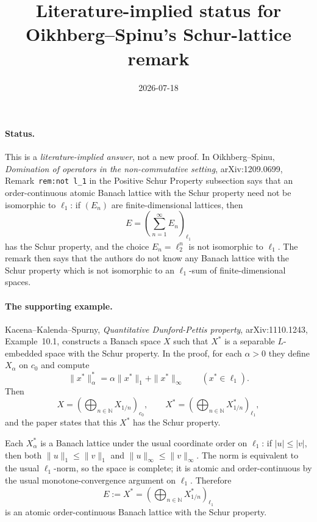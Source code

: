 \documentclass[11pt]{article}
\title{Literature-implied status for Oikhberg--Spinu's Schur-lattice remark}
\author{}
\date{2026-07-18}
\begin{document}
\maketitle

\paragraph{Status.}
This is a \emph{literature-implied answer}, not a new proof.  In
Oikhberg--Spinu, \emph{Domination of operators in the non-commutative
setting}, arXiv:1209.0699, Remark~\texttt{rem:not l\_1} in the Positive Schur
Property subsection says that an order-continuous atomic Banach lattice with
the Schur property need not be isomorphic to \(\ell_1\): if
\((E_n)\) are finite-dimensional lattices, then
\[
  E=\left(\sum_{n=1}^\infty E_n\right)_{\ell_1}
\]
has the Schur property, and the choice \(E_n=\ell_2^n\) is not isomorphic to
\(\ell_1\).  The remark then says that the authors do not know any Banach
lattice with the Schur property which is not isomorphic to an \(\ell_1\)-sum
of finite-dimensional spaces.

\paragraph{The supporting example.}
Kacena--Kalenda--Spurny, \emph{Quantitative Dunford-Pettis property},
arXiv:1110.1243, Example~10.1, constructs a Banach space \(X\) such that
\(X^*\) is a separable \(L\)-embedded space with the Schur property.  In the
proof, for each \(\alpha>0\) they define \(X_\alpha\) on \(c_0\) and compute
\[
  \|x^*\|_\alpha^*=\alpha\|x^*\|_1+\|x^*\|_\infty
  \qquad (x^*\in \ell_1).
\]
Then
\[
  X=\left(\bigoplus_{n\in\mathbb N} X_{1/n}\right)_{c_0},
  \qquad
  X^*=\left(\bigoplus_{n\in\mathbb N} X_{1/n}^*\right)_{\ell_1},
\]
and the paper states that this \(X^*\) has the Schur property.

Each \(X_\alpha^*\) is a Banach lattice under the usual coordinate order on
\(\ell_1\): if \(|u|\le |v|\), then both \(\|u\|_1\le \|v\|_1\) and
\(\|u\|_\infty\le \|v\|_\infty\).  The norm is equivalent to the usual
\(\ell_1\)-norm, so the space is complete; it is atomic and order-continuous
by the usual monotone-convergence argument on \(\ell_1\).  Therefore
\[
  E:=X^*=\left(\bigoplus_{n\in\mathbb N} X_{1/n}^*\right)_{\ell_1}
\]
is an atomic order-continuous Banach lattice with the Schur property.
\end{document}
